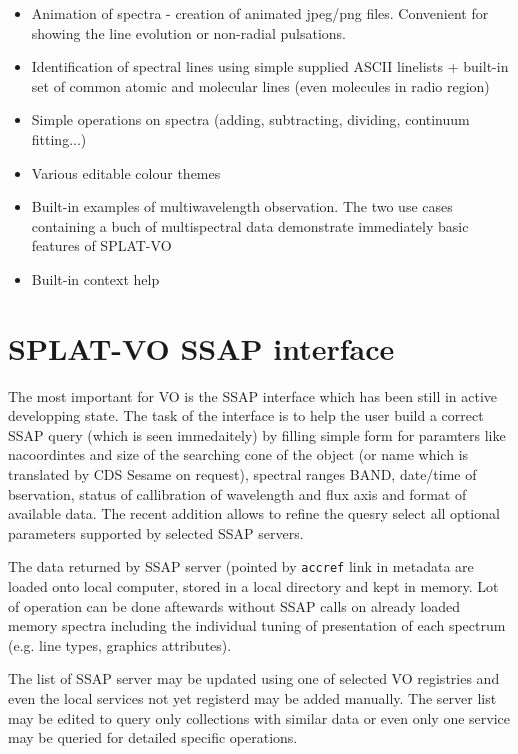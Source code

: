 \documentclass[final,authoryear,5p,times,twocolumn]{elsarticle}
\begin{document}
\begin{itemize}
\item Animation of spectra - creation of animated jpeg/png files. Convenient
for showing the line evolution or non-radial pulsations.

\item Identification of spectral lines using simple supplied ASCII linelists +
built-in set of common  atomic and molecular lines (even molecules in radio
region)

\item Simple operations on spectra (adding, subtracting, dividing, continuum fitting...)

\item Various editable colour themes

\item Built-in examples of multiwavelength observation. The two use cases
containing a buch of multispectral data demonstrate immediately basic features
of SPLAT-VO

\item Built-in context help


\end{itemize}


\section{ SPLAT-VO SSAP interface}

The most important for VO is the SSAP interface which has been still in active
developping state.  The task of the interface is to help the user build a
correct SSAP query (which is seen immedaitely) by filling simple form for
paramters like nacoordintes and size of the searching cone of the object (or
name which is translated by CDS Sesame on request), spectral ranges BAND,
date/time of bservation, status of callibration of  wavelength and flux axis
and format of available data.  The recent addition allows to refine the quesry
select all optional parameters supported by selected SSAP servers.

The data returned by SSAP server (pointed by {\tt accref} link in metadata are
loaded onto local computer, stored in a local directory  and kept in memory.
Lot of operation can be done aftewards without SSAP calls on already loaded
memory spectra including the individual tuning of presentation of each
spectrum (e.g. line types, graphics attributes).

The list of SSAP server may be updated using one of selected VO registries and even the local
services not yet registerd may be added manually. The server list may be
edited to query only collections with similar data or even only one service
may be queried for detailed specific operations.
\end{document}
